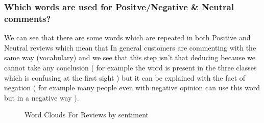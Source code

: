 \documentclass{article}
\begin{document}
\subsubsection{ Which words are used for Positve/Negative \& Neutral comments? }
We can see that there are some words which are repeated in both Positive and Neutral reviews which mean that In general customers are commenting with the same way (vocabulary) and we see that this step isn't that deducing because we cannot take any conclusion ( for example the word  is present in the three classes which is confusing at the first sight ) but it can be explained with the fact of negation ( for example many people even with negative opinion can use this word but in a negative way ).
\begin{figure}[H]
    \centering
    \qquad
    \qquad
    \caption{Word Clouds For Reviews by sentiment}
    \label{fig:example}
\end{figure}
\newpage
\end{document}

